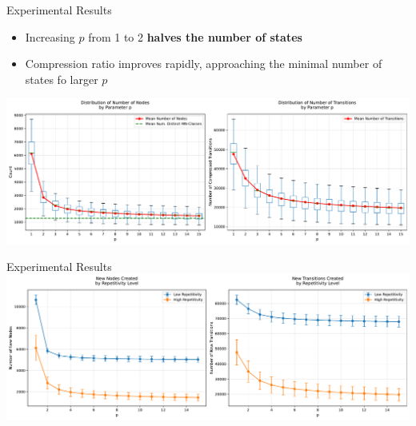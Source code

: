 \documentclass[aspectratio=169]{beamer}
\begin{document}
\begin{frame}{Experimental Results}
	\begin{itemize}
		\item Increasing $p$ from 1 to 2 \textcolor{oiRed}{\textbf{halves the number of states}}
		\item Compression ratio improves rapidly, approaching the minimal number of states fo larger $p$
	\end{itemize}
	\centering
	\includegraphics[width=1\textwidth]{img/tree_compression_analysis.pdf}
\end{frame}

\begin{frame}{Experimental Results}
	\centering
	\includegraphics[width=1\textwidth]{img/high_low_comparison.pdf}
\end{frame}

\end{document}
